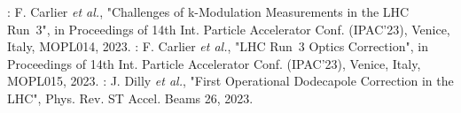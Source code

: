 \begin{declaration}
\newline \newline
\noindent\cite{IPAC:Carlier:Challenges_kmodulation_LHC_Run3}: F. Carlier \textit{et al.}, "Challenges of k-Modulation Measurements in the LHC Run~3", in Proceedings of \num{14}th Int. Particle Accelerator Conf. (IPAC'23), Venice, Italy,  MOPL014, \num{2023}.
\newline \newline
\noindent\cite{IPAC:Carlier:LHC_Run3_Optics_Correction}: F. Carlier \textit{et al.}, "LHC Run~3 Optics Correction", in Proceedings of \num{14}th Int. Particle Accelerator Conf. (IPAC'23), Venice, Italy,  MOPL015, \num{2023}.
\newline \newline
\noindent \cite{PRAB:Dilly:First_Operational_Dodecapole_Correction_LHC}: J. Dilly \textit{et al.}, "First Operational Dodecapole Correction in the LHC", Phys. Rev. ST Accel. Beams \num{26}, \num{2023}.
\newline \newline

\end{declaration}

\cleardoublepage